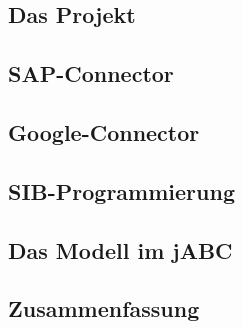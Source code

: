 
\subsection{Das Projekt}




\subsection{SAP-Connector}


\subsection{Google-Connector}




\subsection{SIB-Programmierung}


\subsection{Das Modell im jABC}




\subsection{Zusammenfassung}






